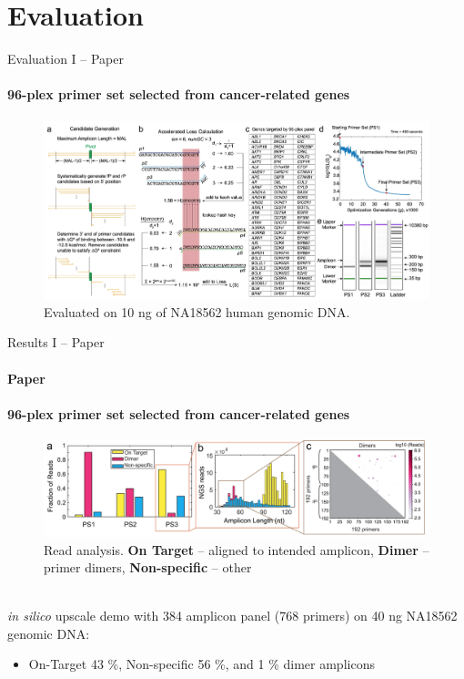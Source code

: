 \documentclass[xcolor=dvipsnames,envcountsect]{beamer}
\begin{document}
\section{Evaluation}
\begin{frame}{Evaluation I -- Paper}\framesubtitle{96-plex primer set selected from cancer-related genes}
\begin{figure}
    \includegraphics[scale=.32,trim={10cm 0 0 0 },clip=true]{fig2_paper}
    \caption{Evaluated on 10 ng of NA18562 human genomic DNA.}
\end{figure}

\end{frame}

\begin{frame}{Results I -- Paper}\framesubtitle{Paper}\framesubtitle{96-plex primer set selected from cancer-related genes}
\begin{figure}
    \includegraphics[width=\textwidth]{fig3_top_paper}
    \caption{Read analysis. {\bf On Target} -- aligned to intended amplicon, {\bf Dimer} -- primer dimers, {\bf Non-specific} -- other}
\end{figure}

\hrulefill\\
{\it in silico} upscale demo with 384 amplicon panel (768 primers) on 40 ng NA18562 genomic DNA:
\begin{itemize}
    \item On-Target 43 \%,  Non-specific 56 \%, and 1 \% dimer amplicons
\end{itemize}
\end{frame}
\end{document}
